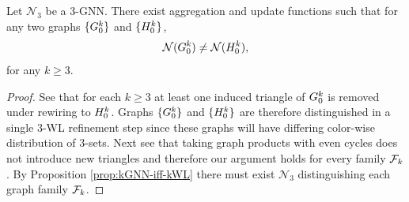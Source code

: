 \begin{proposition}\label{app:Dis3GNN}
Let $\mathcal{N}_3$ be a 3-GNN. There exist aggregation and update functions such that for any two graphs $\{G_0^k\}$ and $\{H_0^k\}$,
\[
\mathcal{N}(G_0^k) \neq \mathcal{N}(H_0^k),
\]    
for any $k \geq 3$.
\end{proposition}
\begin{proof}
    See that for each $k\geq3$ at least one induced triangle of $G_0^k$ is removed under rewiring to $H_0^k$. Graphs $\{G_0^k\}$ and $\{H_0^k\}$ are therefore distinguished in a single 3-WL refinement step since these graphs will have differing color-wise distribution of $3$-sets. Next see that taking graph products with even cycles does not introduce new triangles and therefore our argument holds for every family $\mathcal{F}_k$. By Proposition \ref{prop:kGNN-iff-kWL} there must exist $\mathcal{N}_3$ distinguishing each graph family $\mathcal{F}_k$.
\end{proof}
